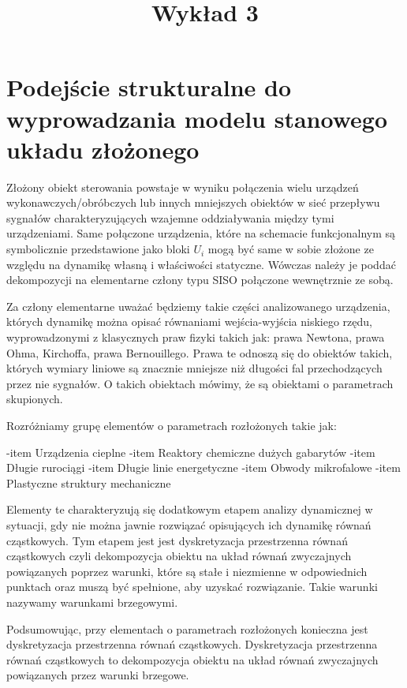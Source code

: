 \documentclass{article}
\title{Wykład 3}
\begin{document}
	\section{Podejście strukturalne do wyprowadzania modelu stanowego układu złożonego}

		Złożony obiekt sterowania powstaje w wyniku połączenia wielu urządzeń wykonawczych/obróbczych lub
		innych mniejszych obiektów  w sieć przepływu sygnałów charakteryzujących wzajemne
		oddziaływania między tymi urządzeniami.
		Same połączone urządzenia, które na schemacie funkcjonalnym są
		symbolicznie przedstawione jako bloki $U_i$ mogą być same w sobie złożone ze względu na
		dynamikę własną i właściwości statyczne. Wówczas należy je poddać dekompozycji na
		elementarne człony typu SISO połączone wewnętrznie ze sobą.
		
		Za człony elementarne uważać będziemy takie części analizowanego urządzenia, których
		dynamikę można opisać równaniami wejścia-wyjścia niskiego rzędu,
		wyprowadzonymi z klasycznych praw fizyki takich jak: prawa Newtona, prawa Ohma,
		Kirchoffa, prawa Bernouillego. Prawa te odnoszą się do obiektów
		takich, których wymiary liniowe są znacznie mniejsze niż długości fal
		przechodzących przez nie sygnałów. O takich obiektach mówimy, że są obiektami
		o parametrach skupionych.

		Rozróżniamy grupę elementów o parametrach rozłożonych takie jak:
		\begin{itemize}
			-item Urządzenia cieplne 
			-item Reaktory chemiczne dużych gabarytów
			-item Długie rurociągi
			-item Długie linie energetyczne
			-item Obwody mikrofalowe
			-item Plastyczne struktury mechaniczne
		\end{itemize}

		Elementy te charakteryzują się dodatkowym etapem analizy dynamicznej
		w sytuacji, gdy nie można jawnie rozwiązać opisujących ich dynamikę równań cząstkowych.
		Tym etapem jest jest dyskretyzacja przestrzenna równań cząstkowych czyli dekompozycja obiektu na układ równań
		zwyczajnych powiązanych poprzez warunki, które są stałe i niezmienne w odpowiednich punktach
		oraz muszą być spełnione, aby uzyskać rozwiązanie. Takie warunki nazywamy warunkami brzegowymi.

		Podsumowując, przy elementach o parametrach rozłożonych konieczna jest dyskretyzacja przestrzenna równań
		cząstkowych. Dyskretyzacja przestrzenna równań cząstkowych to dekompozycja obiektu na układ równań zwyczajnych
		powiązanych przez warunki brzegowe.
\end{document}
